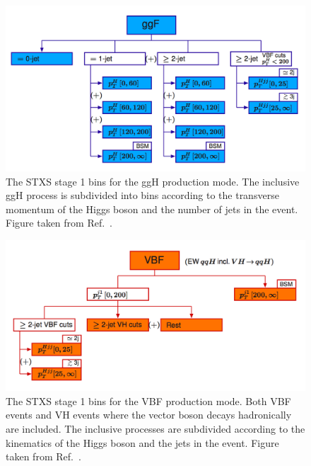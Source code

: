 \begin{figure}[hptb]
  \centering
  \includegraphics[width=\textwidth]{Figures/Theory/stage1ggH.png}
  \caption[Stage 1 STXS bins for the ggH production mode.]
  {
    The STXS stage 1 bins for the ggH production mode.
    The inclusive ggH process is subdivided into bins according to the transverse momentum 
    of the Higgs boson and the number of jets in the event.
    Figure taken from Ref.~\cite{YR4}.
  }
  \label{fig:theory_stage1ggH}
\end{figure}

\begin{figure}[hptb]
  \centering
  \includegraphics[width=\textwidth]{Figures/Theory/stage1VBF.png}
  \caption[Stage 1 STXS bins for the VBF production mode.]
  {
    The STXS stage 1 bins for the VBF production mode.
    Both VBF events and VH events where the vector boson decays hadronically are included.
    The inclusive processes are subdivided according to the kinematics of the Higgs boson 
    and the jets in the event.
    Figure taken from Ref.~\cite{YR4}.
  }
  \label{fig:theory_stage1VBF}
\end{figure}
